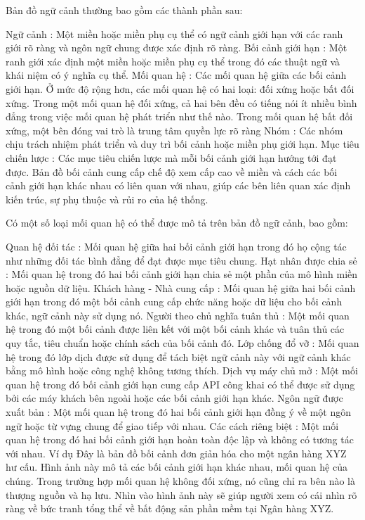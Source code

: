 Bản đồ ngữ cảnh thường bao gồm các thành phần sau:

Ngữ cảnh : Một miền hoặc miền phụ cụ thể có ngữ cảnh giới hạn với các ranh giới rõ ràng và ngôn ngữ chung được xác định rõ ràng.
Bối cảnh giới hạn : Một ranh giới xác định một miền hoặc miền phụ cụ thể trong đó các thuật ngữ và khái niệm có ý nghĩa cụ thể.
Mối quan hệ : Các mối quan hệ giữa các bối cảnh giới hạn. Ở mức độ rộng hơn, các mối quan hệ có hai loại: đối xứng hoặc bất đối xứng. Trong một mối quan hệ đối xứng, cả hai bên đều có tiếng nói ít nhiều bình đẳng trong việc mối quan hệ phát triển như thế nào. Trong mối quan hệ bất đối xứng, một bên đóng vai trò là trung tâm quyền lực rõ ràng
Nhóm : Các nhóm chịu trách nhiệm phát triển và duy trì bối cảnh hoặc miền phụ giới hạn.
Mục tiêu chiến lược : Các mục tiêu chiến lược mà mỗi bối cảnh giới hạn hướng tới đạt được.
Bản đồ bối cảnh cung cấp chế độ xem cấp cao về miền và cách các bối cảnh giới hạn khác nhau có liên quan với nhau, giúp các bên liên quan xác định kiến trúc, sự phụ thuộc và rủi ro của hệ thống.

Có một số loại mối quan hệ có thể được mô tả trên bản đồ ngữ cảnh, bao gồm:

Quan hệ đối tác : Mối quan hệ giữa hai bối cảnh giới hạn trong đó họ cộng tác như những đối tác bình đẳng để đạt được mục tiêu chung.
Hạt nhân được chia sẻ : Mối quan hệ trong đó hai bối cảnh giới hạn chia sẻ một phần của mô hình miền hoặc nguồn dữ liệu.
Khách hàng - Nhà cung cấp : Mối quan hệ giữa hai bối cảnh giới hạn trong đó một bối cảnh cung cấp chức năng hoặc dữ liệu cho bối cảnh khác, ngữ cảnh này sử dụng nó.
Người theo chủ nghĩa tuân thủ : Một mối quan hệ trong đó một bối cảnh được liên kết với một bối cảnh khác và tuân thủ các quy tắc, tiêu chuẩn hoặc chính sách của bối cảnh đó.
Lớp chống đổ vỡ : Mối quan hệ trong đó lớp dịch được sử dụng để tách biệt ngữ cảnh này với ngữ cảnh khác bằng mô hình hoặc công nghệ không tương thích.
Dịch vụ máy chủ mở : Một mối quan hệ trong đó bối cảnh giới hạn cung cấp API công khai có thể được sử dụng bởi các máy khách bên ngoài hoặc các bối cảnh giới hạn khác.
Ngôn ngữ được xuất bản : Một mối quan hệ trong đó hai bối cảnh giới hạn đồng ý về một ngôn ngữ hoặc từ vựng chung để giao tiếp với nhau.
Các cách riêng biệt : Một mối quan hệ trong đó hai bối cảnh giới hạn hoàn toàn độc lập và không có tương tác với nhau.
Ví dụ
Đây là bản đồ bối cảnh đơn giản hóa cho một ngân hàng XYZ hư cấu. Hình ảnh này mô tả các bối cảnh giới hạn khác nhau, mối quan hệ của chúng. Trong trường hợp mối quan hệ không đối xứng, nó cũng chỉ ra bên nào là thượng nguồn và hạ lưu. Nhìn vào hình ảnh này sẽ giúp người xem có cái nhìn rõ ràng về bức tranh tổng thể về bất động sản phần mềm tại Ngân hàng XYZ.

